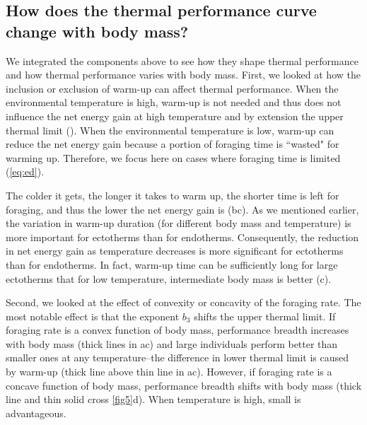 \subsection*{How does the thermal performance curve change with body mass?}

We integrated the components above to see how they shape thermal performance and how thermal performance varies with body mass.
First, we looked at how the inclusion or exclusion of warm-up can affect thermal performance.
When the environmental temperature is high, warm-up is not needed and thus does not influence the net energy gain at high temperature and by extension the upper thermal limit ().
When the environmental temperature is low, warm-up can reduce the net energy gain because a portion of foraging time is ``wasted" for warming up.
Therefore, we focus here on cases where foraging time is limited (\cref{eq:ed}).

The colder it gets, the longer it takes to warm up, the shorter time is left for foraging, and thus the lower the net energy gain is (bc).
As we mentioned earlier, the variation in warm-up duration (for different body mass and temperature) is more important for ectotherms than for endotherms.
Consequently, the reduction in net energy gain as temperature decreases is more significant for ectotherms than for endotherms.
In fact, warm-up time can be sufficiently long for large ectotherms that for low temperature, intermediate body mass is better (c).

Second, we looked at the effect of convexity or concavity of the foraging rate.
The most notable effect is that the exponent $b_3$ shifts the upper thermal limit.
If foraging rate is a convex function of body mass, performance breadth increases with body mass (thick lines in ac) and large individuals perform better than smaller ones at any temperature--the difference in lower thermal limit is caused by warm-up (thick line above thin line in ac).
However, if foraging rate is a concave function of body mass, performance breadth shifts with body mass (thick line and thin solid cross \cref{fig5}d).
When temperature is high, small is advantageous.

